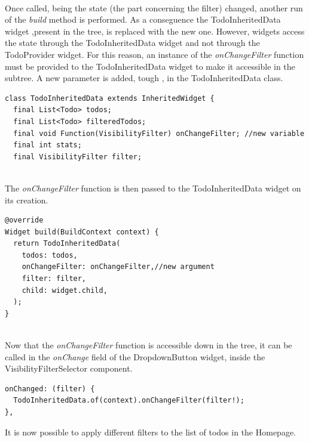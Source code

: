 \mbox{}\\
Once called, being the state (the part concerning the filter) changed, another run of the \textit{build} method is performed. As a conseguence the TodoInheritedData widget ,present in the tree, is replaced with the new one.
However, widgets access the state through the TodoInheritedData widget and not through the TodoProvider widget. For this reason,
an instance of the \textit{onChangeFilter   }function must be provided to the TodoInheritedData widget to make it accessible in the subtree. A new parameter is added, tough , in the TodoInheritedData class.
\mbox{}\\
\begin{code}
\mbox{}
\label{code:2.24}
\begin{verbatim}
class TodoInheritedData extends InheritedWidget {
  final List<Todo> todos;
  final List<Todo> filteredTodos;
  final void Function(VisibilityFilter) onChangeFilter; //new variable
  final int stats;
  final VisibilityFilter filter;
\end{verbatim}
\end{code}
\mbox{}\\
The \textit{onChangeFilter} function is then passed to the TodoInheritedData widget on its creation.
 \mbox{}\\

\begin{code}
\label{code:2.25}
\begin{verbatim}
@override
Widget build(BuildContext context) {
  return TodoInheritedData(
    todos: todos,
    onChangeFilter: onChangeFilter,//new argument
    filter: filter,
    child: widget.child,
  );
}

\end{verbatim}
\end{code}
 \mbox{}\\
Now that the \textit{onChangeFilter   }function is accessible down in the tree, it can be called in the \textit{onChange }field of the DropdownButton widget, inside the VisibilityFilterSelector component.
\mbox{}\\
\mbox{}
\begin{code}

\label{code:2.26}
\begin{verbatim}
onChanged: (filter) {
  TodoInheritedData.of(context).onChangeFilter(filter!);
},
\end{verbatim}
\end{code}
\mbox{}
It is now possible to apply different filters to the list of todos in the Homepage. 


